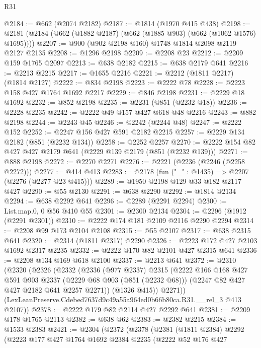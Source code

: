 \begin{lexlean}{R31}
\begin{coremodule}
@2184 := @662 (@2074 @2182)
@2187 := @1814 (@1970 @415 @438)
@2198 := @2181 (@2184 (@662 (@1882 @2187) (@662 (@1885 @903) (@662 (@1062 @1576) @1695))))
@2207 := @900 (@902 @2198 @160) @1748 @1814 @2098 @2119 @2127 @2135
@2208 := @1296 @2198
@2209 := @2208 @23
@2212 := @2209 @159 @1765 @2097
@2213 := @638 @2182
@2215 := @638 @2179 @641
@2216 := @2213 @2215
@2217 := @1655 @2216
@2221 := @2212 (@1811 @2217) (@1814 @2127)
@2222 := @834 @2198
@2223 := @2222 @78
@2228 := @2223 @158 @427 @1764 @1692 @2217
@2229 := @846 @2198
@2231 := @2229 @18 @1692
@2232 := @852 @2198
@2235 := @2231 (@851 (@2232 @18))
@2236 := @2228 @2235
@2242 := @2222 @49 @157 @427 @618 @48 @2216
@2243 := @882 @2198
@2244 := @2243 @45
@2246 := @2242 (@2244 @48)
@2247 := @2222 @152
@2252 := @2247 @156 @427 @591 @2182 @2215
@2257 := @2229 @134 @2182 (@851 (@2232 @134))
@2258 := @2252 @2257
@2270 := @2222 @154 @82 @427 @427 @2179 @641 (@2229 @139 @2179 (@851 (@2232 @139)))
@2271 := @888 @2198
@2272 := @2270 @2271
@2276 := @2221 (@2236 (@2246 (@2258 @2272)))
@2277 := @414 @413
@2283 := @2178 (fun ("_" : @1435) => @2207 (@2276 (@2277 @23 @415)))
@2289 := @1950 @2198 @129 @33 @182 @2117 @427
@2290 := @55 @2130
@2291 := @638 @2290
@2292 := @1814 @2134
@2294 := @638 @2292 @641
@2296 := @2289 (@2291 @2294)
@2300 := List.map.{0, 0} @56 @410 @55
@2301 := @2300 @2134
@2304 := @2296 (@1912 (@2291 @2301))
@2310 := @2222 @174 @181 @2109 @2116 @2290 @2294
@2314 := @2208 @99 @173 @2104 @2108
@2315 := @55 @2107
@2317 := @638 @2315 @641
@2320 := @2314 (@1811 @2317) @2290
@2326 := @2223 @172 @427 @2103 @1692 @2317 @2235
@2332 := @2222 @170 @82 @2101 @427 @2315 @641
@2336 := @2208 @134 @169 @618 @2100
@2337 := @2213 @641
@2372 := @2310
    (@2320
      (@2326
        (@2332
          (@2336
            (@977 @2337)
            @2315
            (@2222
              @166
              @168
              @427
              @591
              @903
              @2337
              (@2229 @68 @903 (@851 (@2232 @68)))
              (@2247 @82 @427 @427 @2182 @641 @2257 @2271))
            (@1326 @415))
          @2271))
      (LexLeanPreserve.Cdebed7637d9c49a55a964ed0b66b80ca.R31.__rel_3 @413 @2107))
@2378 := @2222 @179 @82 @2114 @427 @2292 @641
@2381 := @2209 @178 @1765 @2113
@2382 := @638 @62
@2383 := @2382 @2215
@2384 := @1533 @2383
@2421 := @2304
    (@2372
      (@2378
        (@2381
          (@1811 @2384)
          @2292
          (@2223
            @177
            @427
            @1764
            @1692
            @2384
            @2235
            (@2222
              @52
              @176
              @427

\end{coremodule}
\end{lexlean}
